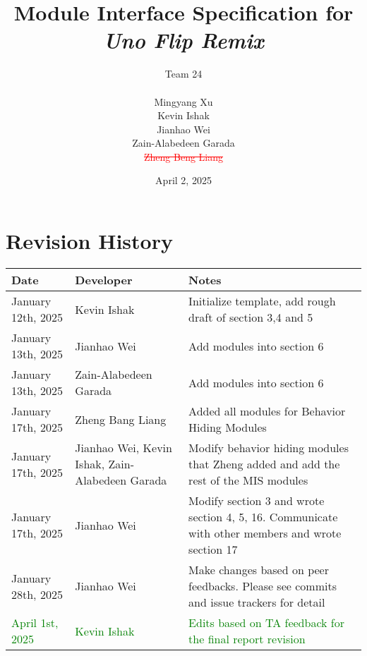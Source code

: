 \documentclass[12pt, titlepage]{article}
\newcommand{\progname}[1]{\textit{#1}}
\newcommand{\removed}[1]{\textcolor{red}{\sout{#1}}}
\newcommand{\added}[1]{\textcolor{green}{#1}}
\begin{document}
\title{Module Interface Specification for \progname{Uno Flip Remix}}


\author{\authname Team 24 \\ \\ Mingyang Xu \\ Kevin Ishak \\ Jianhao Wei \\ Zain-Alabedeen Garada \\ \removed{Zheng Beng Liang}}

\date{April 2, 2025}

\maketitle


\section{Revision History}

\begin{tabularx}{\textwidth}{p{4cm}p{3cm}X}
\toprule {\bf Date} & {\bf Developer} & {\bf Notes}\\
\midrule
January 12th, 2025 & Kevin Ishak & Initialize template, add rough draft of section 3,4 and 5\\
January 13th, 2025 & Jianhao Wei & Add modules into section 6\\
January 13th, 2025 & Zain-Alabedeen Garada & Add modules into section 6\\
January 17th, 2025 & Zheng Bang Liang & Added all modules for Behavior Hiding Modules\\
January 17th, 2025 & Jianhao Wei, Kevin Ishak, Zain-Alabedeen Garada & Modify behavior hiding modules that Zheng added and add the rest of the MIS modules \\
January 17th, 2025 & Jianhao Wei & Modify section 3 and wrote section 4, 5, 16. Communicate with other members and wrote section 17\\
January 28th, 2025 & Jianhao Wei & Make changes based on peer feedbacks. Please see commits and issue trackers for detail\\
\added{April 1st, 2025} & \added{Kevin Ishak} & \added{Edits based on TA feedback for the final report revision}\\
\bottomrule
\end{tabularx}

\newpage
\end{document}
